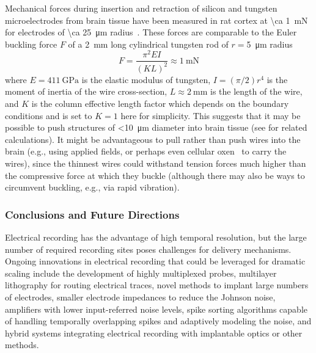Mechanical forces during insertion and retraction of silicon and tungsten microelectrodes from brain tissue have been measured in rat cortex at \SI{\ca 1}{\milli\newton} for electrodes of \SI{\ca 25}{\micro\meter} radius~\cite{jensen03}.
These forces are comparable to the Euler buckling force $F$ of a \SI{2}{\milli\meter} long cylindrical tungsten rod of $r=$\SI{5}{\micro\meter} radius
\[F=\frac{\pi^2 E I}{(K L)^2} \approx \SI{1}{\milli\newton}\]
where $E=\SI{411}{\giga\pascal}$ is the elastic modulus of tungsten, $I=(\pi/2)r^4$ is the moment of inertia of the wire cross-section, $L\approx\SI{2}{\milli\meter}$ is the length of the wire, and $K$ is the column effective length factor which depends on the boundary conditions and is set to $K=1$ here for simplicity.
This suggests that it may be possible to push structures of \SI{<10}{\micro\meter} diameter into brain tissue (see \cite{najafi90} for related calculations). It might be advantageous to pull rather than push wires into the brain (e.g., using applied fields, or perhaps even cellular oxen~\cite{Weibel23082005} to carry the wires), since the thinnest wires could withstand tension forces much higher than the compressive force at which they buckle (although there may also be ways to circumvent buckling, e.g., via rapid vibration).

\subsubsection{Conclusions and Future Directions}

Electrical recording has the advantage of high temporal resolution, but the large number of required recording sites poses challenges for delivery mechanisms.
Ongoing innovations in electrical recording that could be leveraged for dramatic scaling include the development of highly multiplexed probes, multilayer lithography for routing electrical traces, novel methods to implant large numbers of electrodes, smaller electrode impedances to reduce the Johnson noise, amplifiers with lower input-referred noise levels, spike sorting algorithms capable of handling temporally overlapping spikes and adaptively modeling the noise, and hybrid systems integrating electrical recording with implantable optics or other methods.

